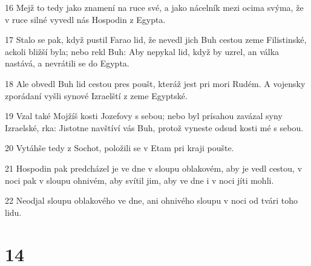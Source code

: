 \par 16 Mejž to tedy jako znamení na ruce své, a jako nácelník mezi ocima svýma, že v ruce silné vyvedl nás Hospodin z Egypta.
\par 17 Stalo se pak, když pustil Farao lid, že nevedl jich Buh cestou zeme Filistinské, ackoli bližší byla; nebo rekl Buh: Aby nepykal lid, když by uzrel, an válka nastává, a nevrátili se do Egypta.
\par 18 Ale obvedl Buh lid cestou pres poušt, kteráž jest pri mori Rudém. A vojensky zporádaní vyšli synové Izraelští z zeme Egyptské.
\par 19 Vzal také Mojžíš kosti Jozefovy s sebou; nebo byl prísahou zavázal syny Izraelské, rka: Jistotne navštíví vás Buh, protož vyneste odsud kosti mé s sebou.
\par 20 Vytáhše tedy z Sochot, položili se v Etam pri kraji poušte.
\par 21 Hospodin pak predcházel je ve dne v sloupu oblakovém, aby je vedl cestou, v noci pak v sloupu ohnivém, aby svítil jim, aby ve dne i v noci jíti mohli.
\par 22 Neodjal sloupu oblakového ve dne, ani ohnivého sloupu v noci od tvári toho lidu.

\chapter{14}

